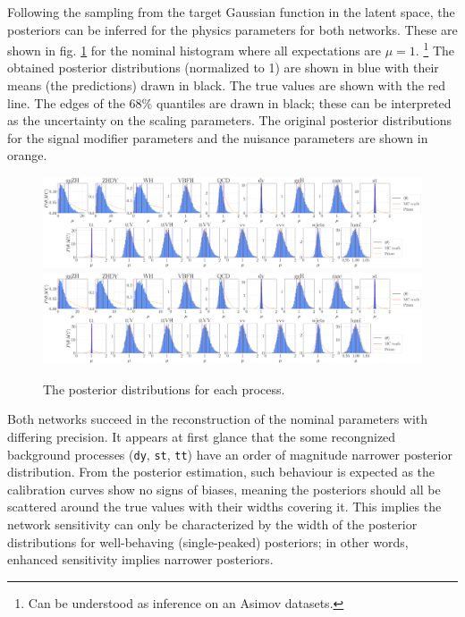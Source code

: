 
Following the sampling from the target Gaussian function in the latent space, the posteriors can be inferred for the physics parameters for both networks. These are shown in fig. \ref{fig:posteriors} for the nominal histogram where all expectations are $\mu=1$. \footnote{Can be understood as inference on an Asimov datasets.} The obtained posterior distributions (normalized to 1) are shown in blue with their means (the predictions) drawn in black. The true values are shown with the red line. The edges of the 68\% quantiles are drawn in black; these can be interpreted as the uncertainty on the scaling parameters. The original posterior distributions for the signal modifier parameters and the nuisance parameters are shown in orange.

\begin{figure}[h!]
	\centering
	\includegraphics[width=\linewidth]{figures/inference/finalNoSummarye11000_posteriors}
	\includegraphics[width=\linewidth]{figures/inference/finalSummary1Layer11000e300NodesCdim100_posteriors}
	\caption{The posterior distributions for each process.}
	\label{fig:posteriors}
\end{figure}

Both networks succeed in the reconstruction of the nominal parameters with differing precision. It appears at first glance that the some recongnized background processes (\texttt{dy}, \texttt{st}, \texttt{tt}) have an order of magnitude narrower posterior distribution. From the posterior estimation, such behaviour is expected as the calibration curves show no signs of biases, meaning the posteriors should all be scattered around the true values with their widths covering it. This implies the network sensitivity can only be characterized by the width of the posterior distributions for well-behaving (single-peaked) posteriors; in other words, enhanced sensitivity implies narrower posteriors.


